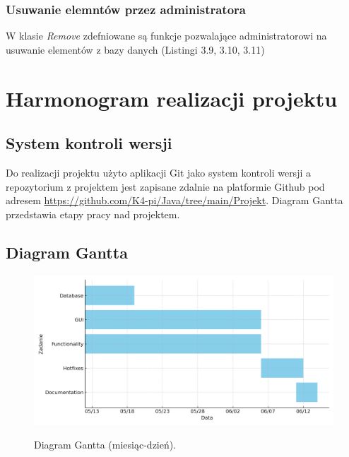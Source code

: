 \newpage
\subsection{Usuwanie elemntów przez administratora}
W klasie \textit{Remove} zdefniowane są funkcje pozwalające administratorowi na usuwanie elementów z bazy danych (Listingi 3.9, 3.10, 3.11)


\newpage 



\chapter{Harmonogram realizacji projektu}
\section{System kontroli wersji}
Do realizacji projektu użyto aplikacji Git jako system kontroli wersji 
a repozytorium z projektem jest zapisane zdalnie na platformie Github pod adresem
\url{https://github.com/K4-pi/Java/tree/main/Projekt}.
Diagram Gantta przedstawia etapy pracy nad projektem.

\section{Diagram Gantta}
\begin{figure}[H]
    \center
    \includegraphics[width=\linewidth]{figures/Gantt-EN.png}\\
    \caption{Diagram Gantta \cite{Gan24} (miesiąc-dzień).\label{fig5}}
\end{figure}

